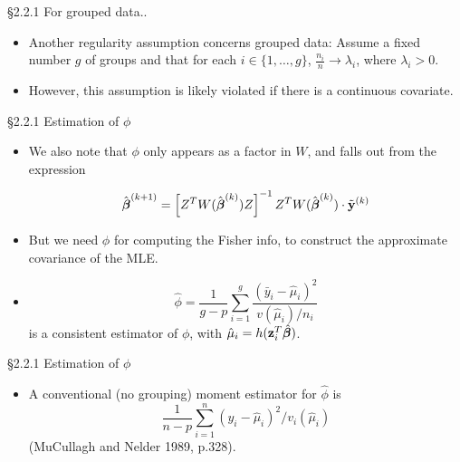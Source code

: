 \documentclass{beamer}
\newcommand{\boldbeta}{{\boldsymbol \beta}}
\newenvironment{wideitemize}%
  {\begin{itemize}%
    \setlength{\parskip}{1em}}%
  {\end{itemize}}
\begin{document}
\begin{frame} {\S2.2.1 For grouped data..}


\begin{wideitemize}





\item Another regularity assumption concerns grouped data: Assume a fixed number $g$  of groups and that for each $i \in \{1, \dots, g\}$, $\frac{n_i}{n} \rightarrow \lambda_i $, where $\lambda_i >0$. 

\item However, this assumption is likely violated if there is a continuous covariate. 



\end{wideitemize}



\end{frame}



\begin{frame} {\S2.2.1 Estimation of $\phi$}
\begin{wideitemize}
\item We also note that $\phi$ only appears as a factor in $W$, and falls out from the expression

 \[\hat{\mbox{\boldmath $\beta$}}^{(k+1)}=\left[Z^TW(\hat{\mbox{\boldmath $\beta$}}^{(k)})Z\right]^{-1}
Z^TW(\hat{\mbox{\boldmath $\beta$}}^{(k)})\cdot \tilde{\textbf{y}}^{(k)}\]
\item But we need $\phi$ for computing the Fisher info, to construct the approximate covariance of the MLE. 

\item\[\hat{\phi}=\frac{1}{g-p}\sum_{i=1}^g\frac{(\bar{y}_i-\hat{\mu}_i)^2}{v(\hat{\mu}_i)/n_i}\]
is a consistent estimator of $\phi$, with $\hat{\mu}_i = h({\bf z}_i^T \hat{\boldbeta})$.
\end{wideitemize}
\end{frame}



\begin{frame} {\S2.2.1 Estimation of $\phi$}
\begin{itemize}


\item A conventional  (no grouping) moment estimator for $\hat{\phi}$ is
\[
\frac{1}{n - p} \sum_{i = 1}^n (y_i - \hat{\mu}_i)^2 /v_i(\hat{\mu}_i)
 \]
(MuCullagh and Nelder 1989, p.328).  \end{itemize}
\end{frame}
\end{document}
